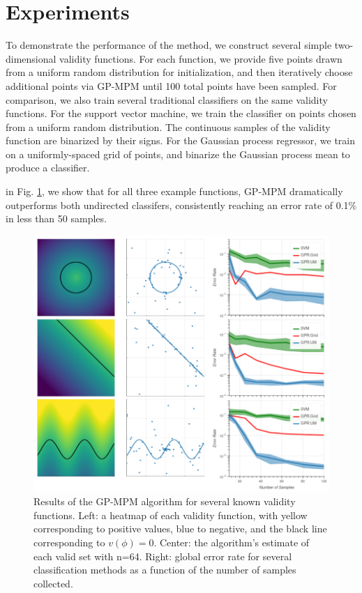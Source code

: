 \documentclass{amsart}
\begin{document}
\section{Experiments}

To demonstrate the performance of the method, we construct several simple two-dimensional validity functions. For each function, we provide five points drawn from a uniform random distribution for initialization, and then iteratively choose additional points via GP-MPM until 100 total points have been sampled. For comparison, we also train several traditional classifiers on the same validity functions. For the support vector machine, we train the classifier on points chosen from a uniform random distribution. The continuous samples of the validity function are binarized by their signs. For the Gaussian process regressor, we train on a uniformly-spaced grid of points, and binarize the Gaussian process mean to produce a classifier.

in Fig. \ref{fig:multicomp}, we show that for all three example functions, GP-MPM dramatically outperforms both undirected classifers, consistently reaching an error rate of 0.1\% in less than 50 samples.

\begin{figure}[htbp]
    \centerline{\includegraphics[width=\textwidth]{img/multi_comp.png}}
    \caption{Results of the GP-MPM algorithm for several known validity functions. Left: a heatmap of each validity function, with yellow corresponding to positive values, blue to negative, and the black line corresponding to $v(\phi)=0$. Center: the algorithm's estimate of each valid set with n=64. Right: global error rate for several classification methods as a function of the number of samples collected.}
    \label{fig:multicomp}
\end{figure}
\end{document}
